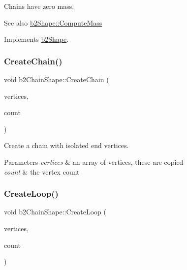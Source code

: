 Chains have zero mass. \begin{DoxySeeAlso}{See also}
\mbox{\hyperlink{classb2Shape_a61b365526241b47f124789b0309cac69}{b2\+Shape\+::\+Compute\+Mass}} 
\end{DoxySeeAlso}


Implements \mbox{\hyperlink{classb2Shape_a61b365526241b47f124789b0309cac69}{b2\+Shape}}.

\mbox{\label{classb2ChainShape_aa0977339b743c05f2179939ccc38e7e0}} 
\subsubsection{\texorpdfstring{Create\+Chain()}{CreateChain()}}
{\footnotesize\ttfamily void b2\+Chain\+Shape\+::\+Create\+Chain (\begin{DoxyParamCaption}\item[{const \mbox{\hyperlink{structb2Vec2}{b2\+Vec2}} $\ast$}]{vertices,  }\item[{int32}]{count }\end{DoxyParamCaption})}

Create a chain with isolated end vertices. 
\begin{DoxyParams}{Parameters}
{\em vertices} & an array of vertices, these are copied \\
\hline
{\em count} & the vertex count \\
\hline
\end{DoxyParams}
\mbox{\label{classb2ChainShape_ac257742a52cac391e25962a4c703fb06}} 
\subsubsection{\texorpdfstring{Create\+Loop()}{CreateLoop()}}
{\footnotesize\ttfamily void b2\+Chain\+Shape\+::\+Create\+Loop (\begin{DoxyParamCaption}\item[{const \mbox{\hyperlink{structb2Vec2}{b2\+Vec2}} $\ast$}]{vertices,  }\item[{int32}]{count }\end{DoxyParamCaption})}

